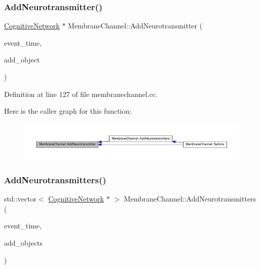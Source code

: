 \subsubsection{\texorpdfstring{Add\+Neurotransmitter()}{AddNeurotransmitter()}}
{\footnotesize\ttfamily \hyperlink{class_cognitive_network}{Cognitive\+Network} $\ast$ Membrane\+Channel\+::\+Add\+Neurotransmitter (\begin{DoxyParamCaption}\item[{std\+::chrono\+::time\+\_\+point$<$ \hyperlink{universe_8h_a0ef8d951d1ca5ab3cfaf7ab4c7a6fd80}{Clock} $>$}]{event\+\_\+time,  }\item[{\hyperlink{class_cognitive_network}{Cognitive\+Network} $\ast$}]{add\+\_\+object }\end{DoxyParamCaption})}



Definition at line 127 of file membranechannel.\+cc.

Here is the caller graph for this function\+:\nopagebreak
\begin{figure}[H]
\begin{center}
\leavevmode
\includegraphics[width=350pt]{class_membrane_channel_ae483c6bc45f73390070b824296762d4c_icgraph}
\end{center}
\end{figure}
\mbox{\label{class_membrane_channel_a01fb5f3176cfa3423bb10a04bf69da01}} 
\subsubsection{\texorpdfstring{Add\+Neurotransmitters()}{AddNeurotransmitters()}}
{\footnotesize\ttfamily std\+::vector$<$ \hyperlink{class_cognitive_network}{Cognitive\+Network} $\ast$ $>$ Membrane\+Channel\+::\+Add\+Neurotransmitters (\begin{DoxyParamCaption}\item[{std\+::chrono\+::time\+\_\+point$<$ \hyperlink{universe_8h_a0ef8d951d1ca5ab3cfaf7ab4c7a6fd80}{Clock} $>$}]{event\+\_\+time,  }\item[{std\+::vector$<$ \hyperlink{class_cognitive_network}{Cognitive\+Network} $\ast$$>$}]{add\+\_\+objects }\end{DoxyParamCaption})}



